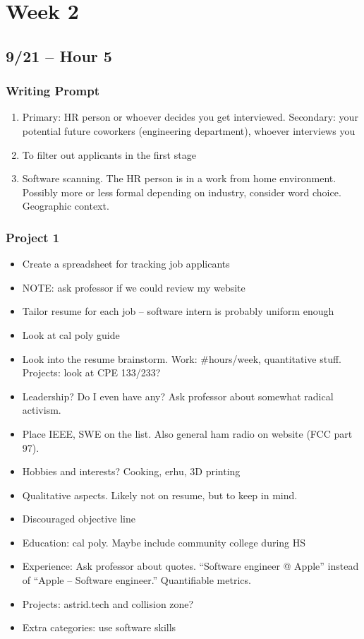 \chapter{Week 2}

\section{9/21 -- Hour 5}

\subsection{Writing Prompt}

\begin{enumerate}
    \item Primary: HR person or whoever decides you get interviewed. Secondary: your potential future coworkers (engineering department), whoever interviews you
    \item To filter out applicants in the first stage
    \item Software scanning. The HR person is in a work from home environment. Possibly more or less formal depending on industry, consider word choice. Geographic context.
\end{enumerate}

\subsection{Project 1}

\begin{itemize}
    \item Create a spreadsheet for tracking job applicants
    \item NOTE: ask professor if we could review my website
    \item Tailor resume for each job -- software intern is probably uniform enough
    \item Look at cal poly guide
    \item Look into the resume brainstorm. Work: \#hours/week, quantitative stuff. Projects: look at CPE 133/233? 
    \item Leadership? Do I even have any? Ask professor about somewhat radical activism.
    \item Place IEEE, SWE on the list. Also general ham radio on website (FCC part 97).
    \item Hobbies and interests? Cooking, erhu, 3D printing
    \item Qualitative aspects. Likely not on resume, but to keep in mind.
    \item Discouraged objective line
    \item Education: cal poly. Maybe include community college during HS
    \item Experience: Ask professor about quotes. ``Software engineer @ Apple'' instead of ``Apple -- Software engineer.'' Quantifiable metrics.
    \item Projects: astrid.tech and collision zone?
    \item Extra categories: use software skills
\end{itemize}


